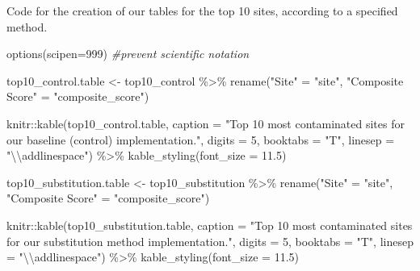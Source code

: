 \documentclass[12pt, twoside]{amherstthesis}
\newenvironment{Shaded}{\begin{snugshade}}{\end{snugshade}}
\newcommand{\AttributeTok}[1]{\textcolor[rgb]{0.77,0.63,0.00}{#1}}
\newcommand{\CommentTok}[1]{\textcolor[rgb]{0.56,0.35,0.01}{\textit{#1}}}
\newcommand{\DecValTok}[1]{\textcolor[rgb]{0.00,0.00,0.81}{#1}}
\newcommand{\FloatTok}[1]{\textcolor[rgb]{0.00,0.00,0.81}{#1}}
\newcommand{\FunctionTok}[1]{\textcolor[rgb]{0.00,0.00,0.00}{#1}}
\newcommand{\NormalTok}[1]{#1}
\newcommand{\OtherTok}[1]{\textcolor[rgb]{0.56,0.35,0.01}{#1}}
\newcommand{\SpecialCharTok}[1]{\textcolor[rgb]{0.00,0.00,0.00}{#1}}
\newcommand{\StringTok}[1]{\textcolor[rgb]{0.31,0.60,0.02}{#1}}
\begin{document}
Code for the creation of our tables for the top 10 sites, according to a specified method.
\begin{Shaded}
\begin{Highlighting}[]
\FunctionTok{options}\NormalTok{(}\AttributeTok{scipen=}\DecValTok{999}\NormalTok{) }\CommentTok{\#prevent scientific notation}

\NormalTok{top10\_control.table }\OtherTok{\textless{}{-}}\NormalTok{ top10\_control }\SpecialCharTok{\%\textgreater{}\%}
  \FunctionTok{rename}\NormalTok{(}\StringTok{"Site"} \OtherTok{=} \StringTok{"site"}\NormalTok{, }
         \StringTok{"Composite Score"} \OtherTok{=} \StringTok{"composite\_score"}\NormalTok{)}

\NormalTok{knitr}\SpecialCharTok{::}\FunctionTok{kable}\NormalTok{(top10\_control.table, }\AttributeTok{caption =} \StringTok{"Top 10 most contaminated sites }
\StringTok{             for our baseline (control) implementation."}\NormalTok{, }
             \AttributeTok{digits =} \DecValTok{5}\NormalTok{, }\AttributeTok{booktabs =} \StringTok{"T"}\NormalTok{, }\AttributeTok{linesep =} \StringTok{"}\SpecialCharTok{\textbackslash{}\textbackslash{}}\StringTok{addlinespace"}\NormalTok{) }\SpecialCharTok{\%\textgreater{}\%}
  \FunctionTok{kable\_styling}\NormalTok{(}\AttributeTok{font\_size =} \FloatTok{11.5}\NormalTok{) }
\end{Highlighting}
\end{Shaded}
\begin{Shaded}
\begin{Highlighting}[]
\NormalTok{top10\_substitution.table }\OtherTok{\textless{}{-}}\NormalTok{ top10\_substitution }\SpecialCharTok{\%\textgreater{}\%}
  \FunctionTok{rename}\NormalTok{(}\StringTok{"Site"} \OtherTok{=} \StringTok{"site"}\NormalTok{, }
         \StringTok{"Composite Score"} \OtherTok{=} \StringTok{"composite\_score"}\NormalTok{)}

\NormalTok{knitr}\SpecialCharTok{::}\FunctionTok{kable}\NormalTok{(top10\_substitution.table, }\AttributeTok{caption =} \StringTok{"Top 10 most contaminated sites }
\StringTok{             for our substitution method implementation."}\NormalTok{, }
             \AttributeTok{digits =} \DecValTok{5}\NormalTok{, }\AttributeTok{booktabs =} \StringTok{"T"}\NormalTok{, }\AttributeTok{linesep =} \StringTok{"}\SpecialCharTok{\textbackslash{}\textbackslash{}}\StringTok{addlinespace"}\NormalTok{) }\SpecialCharTok{\%\textgreater{}\%}
  \FunctionTok{kable\_styling}\NormalTok{(}\AttributeTok{font\_size =} \FloatTok{11.5}\NormalTok{) }
\end{Highlighting}
\end{Shaded}
\end{document}
